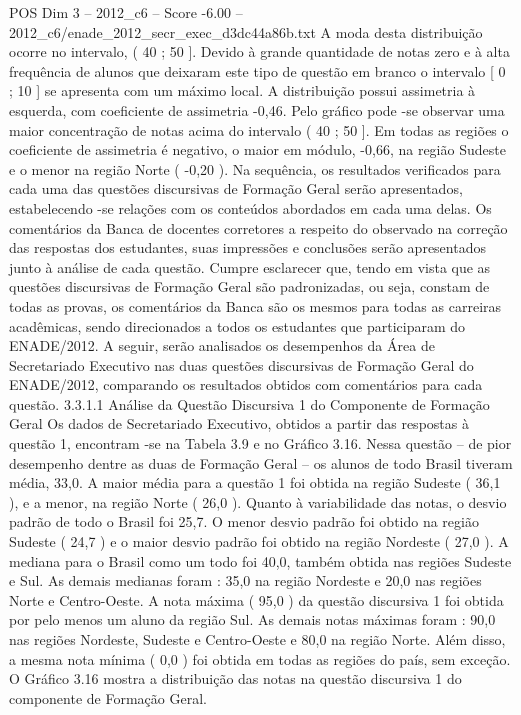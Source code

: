 \begin{textsample}{POS Dim 3 – 2012\_c6 – Score -6.00 – 2012\_c6/enade\_2012\_secr\_exec\_d3dc44a86b.txt}
A moda desta distribuição ocorre no intervalo, ( 40 ; 50 ].
Devido à grande quantidade de notas zero e à alta frequência de alunos que deixaram este tipo de questão em branco o intervalo [ 0 ; 10 ] se apresenta com um máximo local.
A distribuição possui assimetria à esquerda, com coeficiente de assimetria -0,46.
Pelo gráfico pode -se observar uma maior concentração de notas acima do intervalo ( 40 ; 50 ].
Em todas as regiões o coeficiente de assimetria é negativo, o maior em módulo, -0,66, na região Sudeste e o menor na região Norte ( -0,20 ).
Na sequência, os resultados verificados para cada uma das questões discursivas de Formação Geral serão apresentados, estabelecendo -se relações com os conteúdos abordados em cada uma delas.
Os comentários da Banca de docentes corretores a respeito do observado na correção das respostas dos estudantes, suas impressões e conclusões serão apresentados junto à análise de cada questão.
Cumpre esclarecer que, tendo em vista que as questões discursivas de Formação Geral são padronizadas, ou seja, constam de todas as provas, os comentários da Banca são os mesmos para todas as carreiras acadêmicas, sendo direcionados a todos os estudantes que participaram do ENADE/2012.
A seguir, serão analisados os desempenhos da Área de Secretariado Executivo nas duas questões discursivas de Formação Geral do ENADE/2012, comparando os resultados obtidos com comentários para cada questão. 3.3.1.1 Análise da Questão Discursiva 1 do Componente de Formação Geral Os dados de Secretariado Executivo, obtidos a partir das respostas à questão 1, encontram -se na Tabela 3.9 e no Gráfico 3.16.
Nessa questão – de pior desempenho dentre as duas de Formação Geral – os alunos de todo Brasil tiveram média, 33,0.
A maior média para a questão 1 foi obtida na região Sudeste ( 36,1 ), e a menor, na região Norte ( 26,0 ).
Quanto à variabilidade das notas, o desvio padrão de todo o Brasil foi 25,7.
O menor desvio padrão foi obtido na região Sudeste ( 24,7 ) e o maior desvio padrão foi obtido na região Nordeste ( 27,0 ).
A mediana para o Brasil como um todo foi 40,0, também obtida nas regiões Sudeste e Sul.
As demais medianas foram : 35,0 na região Nordeste e 20,0 nas regiões Norte e Centro-Oeste.
A nota máxima ( 95,0 ) da questão discursiva 1 foi obtida por pelo menos um aluno da região Sul.
As demais notas máximas foram : 90,0 nas regiões Nordeste, Sudeste e Centro-Oeste e 80,0 na região Norte.
Além disso, a mesma nota mínima ( 0,0 ) foi obtida em todas as regiões do país, sem exceção.
O Gráfico 3.16 mostra a distribuição das notas na questão discursiva 1 do componente de Formação Geral.

\end{textsample}
